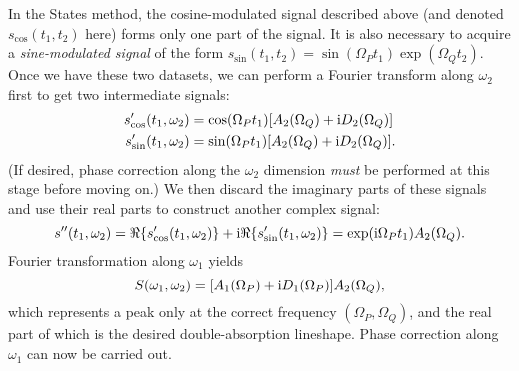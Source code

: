 In the States method, the cosine-modulated signal described above (and denoted $s_\text{cos}(t_1, t_2)$ here) forms only one part of the signal.
It is also necessary to acquire a \textit{sine-modulated signal} of the form $s_\text{sin}(t_1, t_2) = \sin(\Omega_P t_1)\exp(\Omega_Q t_2)$.
Once we have these two datasets, we can perform a Fourier transform along $\omega_2$ first to get two intermediate signals:
\begin{align}
    \label{eq:states_1}
    s'_\text{cos}(t_1, \omega_2) &= \cos(\Omega_P t_1) [A_2(\Omega_Q) + \mathrm{i} D_2(\Omega_Q)] \\
    s'_\text{sin}(t_1, \omega_2) &= \sin(\Omega_P t_1) [A_2(\Omega_Q) + \mathrm{i} D_2(\Omega_Q)].
\end{align}
(If desired, phase correction along the $\omega_2$ dimension \textit{must} be performed at this stage before moving on.)
We then discard the imaginary parts of these signals and use their real parts to construct another complex signal:
\begin{equation}
    \label{eq:states_3}
    s''(t_1, \omega_2) = \Re\{s'_\text{cos}(t_1, \omega_2)\} + \mathrm{i} \Re\{s'_\text{sin}(t_1, \omega_2)\} = \exp(\mathrm{i} \Omega_P t_1)A_2(\Omega_Q).
\end{equation}
Fourier transformation along $\omega_1$ yields
\begin{equation}
    \label{eq:states_4}
    S(\omega_1, \omega_2) = [A_1(\Omega_P) + \mathrm{i} D_1(\Omega_P)] A_2(\Omega_Q),
\end{equation}
which represents a peak only at the correct frequency $(\Omega_P, \Omega_Q)$, and the real part of which is the desired double-absorption lineshape.
Phase correction along $\omega_1$ can now be carried out.%
